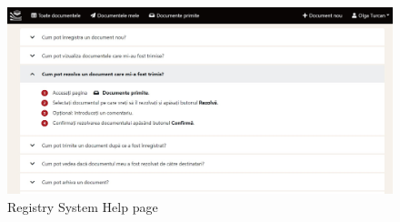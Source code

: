 \begin{figure}[H]
    \centering
    \includegraphics[width=5in]{images/app/help_page}
    \caption{Registry System Help page}
    \label{helpPage}
\end{figure}
